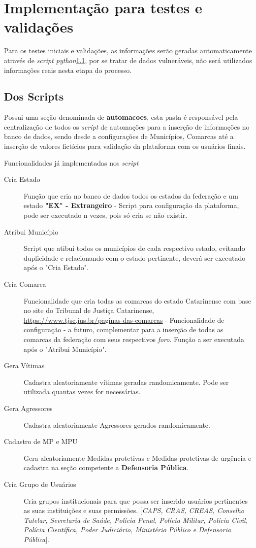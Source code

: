 \section{Implementação para testes e validações}
\par Para os testes iniciais e validações, as informações serão geradas automaticamente através de \textit{script python}\ref{script}, por se tratar de dados vulneráveis, não será utilizados informações reais nesta etapa do processo.

\subsection{Dos Scripts}\label{script}
\par Possui uma seção denominada de \textbf{automacoes}, esta pasta é responsável pela centralização de todos os \textit{script} de automações para a inserção de informações no banco de dados, sendo desde a configurações de Municípios, Comarcas até a inserção de valores fictícios para validação da plataforma com os usuários finais.
\par Funcionalidades já implementadas nos \textit{script}

\begin{description}
   \item [Cria Estado] Função que cria no banco de dados todos os estados da federação e um estado \textbf{"EX" - Extrangeiro} - Script para configuração da plataforma, pode ser executado n vezes, pois só cria se não existir.
   \item [Atribui Município] Script que atibui todos os municípios de cada respectivo estado, evitando duplicidade e relacionando com o estado pertinente, deverá ser executado após o "Cria Estado".
   \item [Cria Comarca] Funcionalidade que cria todas as comarcas do estado Catarinense com base no site do Tribunal de Justiça Catarinense, \href{https://www.tjsc.jus.br/paginas-das-comarcas}{https://www.tjsc.jus.br/paginas-das-comarcas} - Funcionalidade de configuração - a futuro, complementar para a inserção de todas as comarcas da federação com seus respectivos \textit{foro}. Função a ser executada após o "Atribui Município".
   \item [Gera Vítimas] Cadastra aleatoriamente vítimas geradas randomicamente. Pode ser utilizada quantas vezes for necessárias.
   \item [Gera Agressores] Cadastra aleatoriamente Agressores gerados randomicamente.
   \item [Cadastro de MP e MPU] Gera aleatoriamente Medidas protetivas e Medidas protetivas de urgência e cadastra na seção competente a \textbf{Defensoria Pública}.
   \item [Cria Grupo de Usuários] Cria grupos institucionais para que possa ser inserido usuários pertinentes as suas instituições e suas permissões. [\textit{CAPS, CRAS, CREAS, Conselho Tutelar, Sevretaria de Saúde, Polícia Penal, Polícia Militar, Polícia Civil, Polícia Científica, Poder Judiciário, Ministério Público e Defensoria Pública}].
 \end{description}


